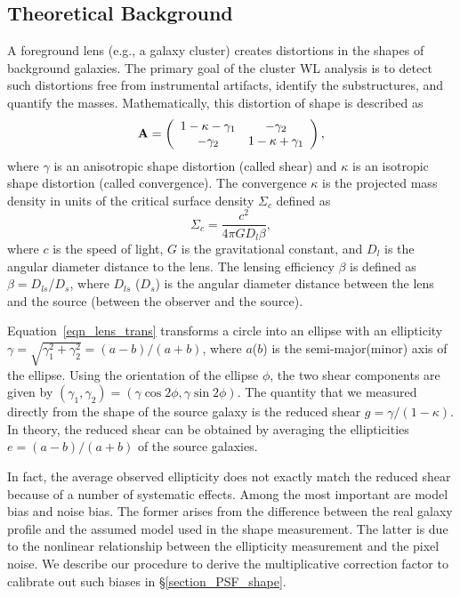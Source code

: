 \documentclass[twocolumn]{aastex631}
\begin{document}
\subsection{Theoretical Background} \label{theory}
A foreground lens (e.g., a galaxy cluster) creates distortions in the shapes of background galaxies. The primary goal of the cluster WL analysis is to detect such distortions free from instrumental artifacts, identify the substructures, and quantify the masses. 
Mathematically, this distortion of shape is described as 
\begin{equation}
\textbf{A} = \left (\begin{array} {c c} 1 - \kappa - \gamma_1 & -\gamma _2 \\
                      -\gamma_2 & 1 - \kappa + \gamma_1
          \end{array}  \right ), \label{eqn_lens_trans}
\end{equation}
\noindent
where $\gamma$ is an anisotropic shape distortion (called shear) and $\kappa$ is an isotropic shape distortion (called convergence). 
The convergence $\kappa$ is the projected mass density in units of the critical surface density $\Sigma_c$ defined as 
\begin{equation}
\Sigma_c = \frac{c^2}{4 \pi G D_l \beta}, \label{eqn_sigma_c}
\end{equation}
\noindent
where $c$ is the speed of light, $G$ is the gravitational constant, and $D_l$ is the angular diameter distance to the lens. 
The lensing efficiency $\beta$ is defined as $\beta=D_{ls}$/$D_s$, where $D_{ls}$ ($D_s$) is the angular diameter distance between the lens and the source (between the observer and the source).


Equation~\ref{eqn_lens_trans} transforms a circle into an ellipse with an ellipticity $\gamma=\sqrt{\gamma_1^2 +\gamma_2^2}=(a-b)/(a+b)$, where $a$($b$) is the semi-major(minor) axis of the ellipse. 
Using the orientation of the ellipse $\phi$, the two shear components are given by $(\gamma_1,\gamma_2)=(\gamma \cos 2\phi, \gamma \sin 2\phi)$. 
The quantity that we measured directly from the shape of the source galaxy is the reduced shear $g = \gamma / (1 - \kappa)$. 
In theory, the reduced shear can be obtained by averaging the ellipticities $e = (a-b)/(a+b)$ of the source galaxies. 


In fact, the average observed ellipticity does not exactly match the reduced shear because of a number of systematic effects. 
Among the most important are model bias and noise bias. 
The former arises from the difference between the real galaxy profile and the assumed model used in the shape measurement. 
The latter is due to the nonlinear relationship between the ellipticity measurement and the pixel noise. 
We describe our procedure to derive the multiplicative correction factor to calibrate out such biases in \S\ref{section_PSF_shape}.
\end{document}
